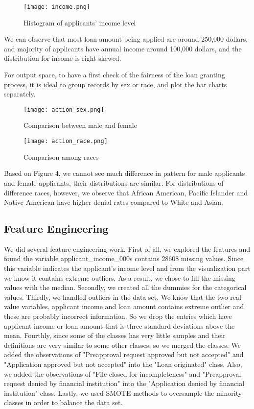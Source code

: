 \documentclass[letterpaper, 10 pt, conference]{ieeeconf}  %
\begin{document}
\begin{figure}[H]
    \centering
    \texttt{[image: income.png]}
    \caption{Histogram of applicants' income level}
\end{figure}

We can observe that most loan amount being applied are around 250,000 dollars, and majority of applicants have annual income around 100,000 dollars, and the distribution for income is right-skewed.

For output space, to have a first check of the fairness of the loan granting process, it is ideal to group records by sex or race, and plot the bar charts separately.

\begin{figure}[H]
    \centering
    \texttt{[image: action\_sex.png]}
    \caption{Comparison between male and female}
\end{figure}

\begin{figure}[H]
    \centering
    \texttt{[image: action\_race.png]}
    \caption{Comparison among races}
\end{figure}


Based on Figure 4, we cannot see much difference in pattern for male applicants and female applicants, their distributions are similar. For distributions of difference races, however, we observe that African American, Pacific Islander and Native American have higher denial rates compared to White and Asian. 

\subsection{Feature Engineering}
We did several feature engineering work. First of all, we explored the features and found the variable applicant\_income\_000s contains 28608 missing values. Since this variable indicates the applicant's income level and from the visualization part we know it contains extreme outliers. As a result, we chose to fill the missing values with the median. Secondly, we created all the dummies for the categorical values. Thirdly, we handled outliers in the data set. We know that the two real value variables, applicant income and loan amount contains extreme outlier and these are probably incorrect information. So we drop the entries which have applicant income or loan amount that is three standard deviations above the mean. Fourthly, since some of the classes has very little samples and their definitions are very similar to some other classes, so we merged the classes. We added the observations of "Preapproval request approved but not accepted" and "Application approved but not accepted" into the "Loan originated" class. Also, we added the observations of "File closed for incompleteness" and "Preapproval request denied by financial institution" into the "Application denied by financial institution" class. Lastly, we used SMOTE methods to oversample the minority classes in order to balance the data set. 
\end{document}
